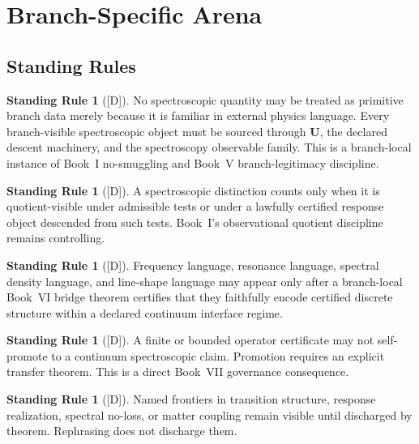 \documentclass[12pt,oneside]{amsbook}
\theoremstyle{plain}
\theoremstyle{definition}
\newtheorem{standingrule}[theorem]{Standing Rule}
\theoremstyle{remark}
\newcommand{\status}[1]{\textup{[#1]}}
\begin{document}
\section{Branch-Specific Arena}\label{sec:spec-arena}

\subsection{Standing Rules}\label{sec:spec-standing-rules}

\begin{standingrule}[\status{D}]\label{sr:spec-no-smuggling}
No spectroscopic quantity may be treated as primitive branch data merely
because it is familiar in external physics language. Every branch-visible
spectroscopic object must be sourced through $\mathbf{U}$, the declared
descent machinery, and the spectroscopy observable family. This is a
branch-local instance of Book~I no-smuggling and Book~V branch-legitimacy
discipline.
\end{standingrule}

\begin{standingrule}[\status{D}]\label{sr:spec-quotient-visible}
A spectroscopic distinction counts only when it is quotient-visible under
admissible tests or under a lawfully certified response object descended
from such tests. Book~I's observational quotient discipline remains
controlling.
\end{standingrule}

\begin{standingrule}[\status{D}]\label{sr:spec-continuum-gate}
Frequency language, resonance language, spectral density language, and
line-shape language may appear only after a branch-local Book~VI bridge
theorem certifies that they faithfully encode certified discrete structure
within a declared continuum interface regime.
\end{standingrule}

\begin{standingrule}[\status{D}]\label{sr:spec-no-self-promotion}
A finite or bounded operator certificate may not self-promote to a
continuum spectroscopic claim. Promotion requires an explicit transfer
theorem. This is a direct Book~VII governance consequence.
\end{standingrule}

\begin{standingrule}[\status{D}]\label{sr:spec-frontier-visibility}
Named frontiers in transition structure, response realization, spectral
no-loss, or matter coupling remain visible until discharged by theorem.
Rephrasing does not discharge them.
\end{standingrule}
\end{document}
